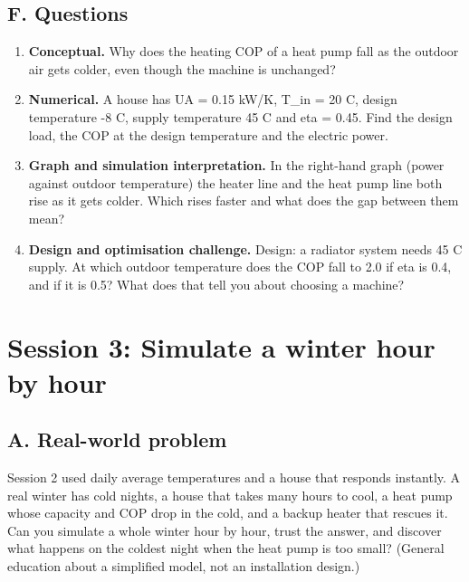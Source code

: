 \documentclass[11pt,a4paper]{article}
\begin{document}
\subsection*{F. Questions}
\begin{enumerate}[nosep]
\item \textbf{Conceptual.} Why does the heating COP of a heat pump fall as the outdoor air gets colder, even though the machine is unchanged?
\item \textbf{Numerical.} A house has UA = 0.15 kW/K, T\_in = 20 C, design temperature -8 C, supply temperature 45 C and eta = 0.45. Find the design load, the COP at the design temperature and the electric power.
\item \textbf{Graph and simulation interpretation.} In the right-hand graph (power against outdoor temperature) the heater line and the heat pump line both rise as it gets colder. Which rises faster and what does the gap between them mean?
\item \textbf{Design and optimisation challenge.} Design: a radiator system needs 45 C supply. At which outdoor temperature does the COP fall to 2.0 if eta is 0.4, and if it is 0.5? What does that tell you about choosing a machine?
\end{enumerate}

\section{Session 3: Simulate a winter hour by hour}

\subsection*{A. Real-world problem}
Session 2 used daily average temperatures and a house that responds instantly. A real winter has cold nights, a house that takes many hours to cool, a heat pump whose capacity and COP drop in the cold, and a backup heater that rescues it. Can you simulate a whole winter hour by hour, trust the answer, and discover what happens on the coldest night when the heat pump is too small? (General education about a simplified model, not an installation design.)
\end{document}
